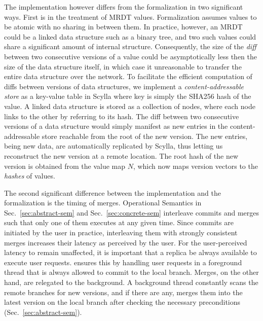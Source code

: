 The implementation however differs from the formalization in two
significant ways. First is in the treatment of MRDT values.
Formalization assumes values to be atomic with no sharing in between
them. In practice, however, an MRDT could be a linked data structure
such as a binary tree, and two such values could share a significant
amount of internal structure.  Consequently, the size of the
\emph{diff} between two consecutive versions of a value could be
asymptotically less then the size of the data structure itself, in
which case it unreasonable to transfer the entire data structure over
the network. To facilitate the efficient computation of diffs between
versions of data structures, we implement a \emph{content-addressable
store} as a key-value table in Scylla where key is simply the SHA256
hash of the value. A linked data structure is stored as a collection
of nodes, where each node links to the other by referring to its hash.
The diff between two consecutive versions of a data structure would
simply manifest as new entries in the content-addressable store
reachable from the root of the new version. The new entries, being new
data, are automatically replicated by Scylla, thus letting us
reconstruct the new version at a remote location. The root hash of the
new version is obtained from the value map $N$, which now maps version
vectors to the \emph{hashes} of values.

The second significant difference between the implementation and the
formalization is the timing of merges. Operational Semantics in
Sec.~\ref{sec:abstract-sem} and Sec.~\ref{sec:concrete-sem} interleave
commits and merges such that only one of them executes at any given
time. Since commits are initiated by the user in practice,
interleaving them with strongly consistent merges increases their
latency as perceived by the user. For the user-perceived latency to
remain unaffected, it is important that a replica be always available
to execute user requests. \quark ensures this by handling user
requests in a foreground thread that is always allowed to commit to
the local branch. Merges, on the other hand, are relegated to the
background. A background thread constantly scans the remote branches
for new versions, and if there are any, merges them into the latest
version on the local branch after checking the necessary preconditions
(Sec.~\ref{sec:abstract-sem}). 

